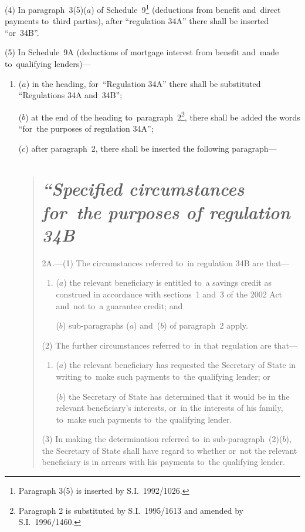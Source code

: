 \documentclass[12pt,a4paper]{article}
\begin{document}
(4) In paragraph~3(5)($a$)  of Schedule~9\footnote{Paragraph 3(5) is inserted by S.I.~1992/1026.} (deductions from benefit and~direct payments to~third parties), after “regulation 34A” there shall be inserted “or~34B”.

(5) In Schedule~9A (deductions of mortgage interest from benefit and~made to~qualifying lenders)—
\begin{enumerate}\item[]
($a$) in the heading, for~“Regulation 34A” there shall be substituted “Regulations 34A and~34B”;

($b$) at the end of the heading to~paragraph~2\footnote{Paragraph 2 is substituted by S.I.~1995/1613 and amended by S.I.~1996/1460.}, there shall be added the words “for~the purposes of regulation 34A”;

($c$) after paragraph~2, there shall be inserted the following paragraph—
\begin{quotation}
\section*{\itshape\sloppy{} “Specified circumstances for~the purposes of regulation 34B}

2A.---(1)  The circumstances referred to~in regulation 34B are that—
\begin{enumerate}\item[]
($a$) the relevant beneficiary is entitled to~a savings credit as construed in accordance with sections~1 and~3 of the 2002 Act and~not to~a guarantee credit; and

($b$) sub-paragraphs ($a$)  and~($b$)  of paragraph~2 apply.
\end{enumerate}

(2) The further circumstances referred to~in that regulation are that—
\begin{enumerate}\item[]
($a$) the relevant beneficiary has requested the Secretary of State in writing to~make such payments to~the qualifying lender; or

($b$) the Secretary of State has determined that it would be in the relevant beneficiary’s interests, or~in the interests of his family, to~make such payments to~the qualifying lender.
\end{enumerate}

(3) In making the determination referred to~in sub-\hspace{0pt}paragraph~(2)($b$), the Secretary of State shall have regard to whether or~not the relevant beneficiary is in arrears with his payments to~the qualifying lender.


\end{quotation}
\end{enumerate}
\end{document}
